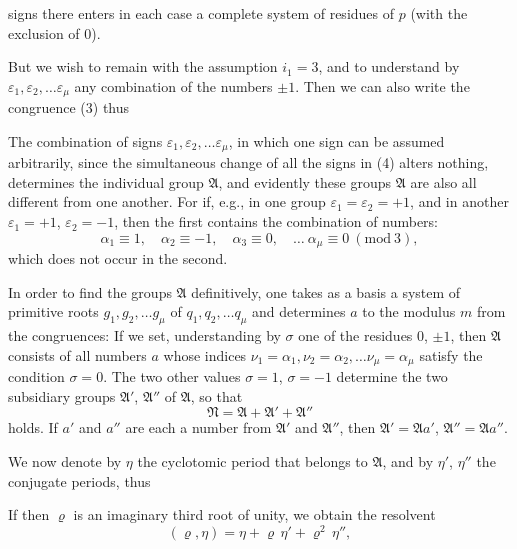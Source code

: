 signs there enters in each case a complete system of residues of $p$ (with the exclusion of 0).

But we wish to remain with the assumption $i_1=3$, and to understand by $\varepsilon_1, \varepsilon_2, \ldots \varepsilon_\mu$ any combination of the numbers $\pm 1$. Then we can also write the congruence (3) thus

The combination of signs $\varepsilon_1, \varepsilon_2, \ldots \varepsilon_\mu$, in which one sign can be assumed arbitrarily, since the simultaneous change of all the signs in (4) alters nothing, determines the individual group $\mathfrak{A}$, and evidently these groups $\mathfrak{A}$ are also all different from one another. For if, e.g., in one group $\varepsilon_1=\varepsilon_2=+1$, and in another $\varepsilon_1=+1$, $\varepsilon_2=-1$, then the first contains the combination of numbers:
\[
\alpha_1\equiv 1,\quad \alpha_2\equiv -1,\quad \alpha_3\equiv 0,\quad \ldots\ \alpha_\mu\equiv 0\ (\mathrm{mod}\ 3),
\]
which does not occur in the second.

In order to find the groups $\mathfrak{A}$ definitively, one takes as a basis a system of primitive roots $g_1, g_2, \ldots g_\mu$ of $q_1, q_2, \ldots q_\mu$ and determines $a$ to the modulus $m$ from the congruences:
If we set, understanding by $\sigma$ one of the residues 0, $\pm 1$,
then $\mathfrak{A}$ consists of all numbers $a$ whose indices $\nu_1=\alpha_1, \nu_2=\alpha_2, \ldots \nu_\mu=\alpha_\mu$ satisfy the condition $\sigma=0$. The two other values $\sigma=1$, $\sigma=-1$ determine the two subsidiary groups
$\mathfrak{A}'$, $\mathfrak{A}''$ of $\mathfrak{A}$, so that
\[
\mathfrak{N} = \mathfrak{A} + \mathfrak{A}' + \mathfrak{A}''
\]
holds. If $a'$ and $a''$ are each a number from $\mathfrak{A}'$ and $\mathfrak{A}''$, then $\mathfrak{A}'=\mathfrak{A}a'$, $\mathfrak{A}''=\mathfrak{A}a''$.

We now denote by $\eta$ the cyclotomic period that belongs to $\mathfrak{A}$, and by $\eta'$, $\eta''$ the conjugate periods, thus

If then $\varrho$ is an imaginary third root of unity, we obtain the resolvent
\[
(\varrho, \eta) = \eta + \varrho\,\eta' + \varrho^2\,\eta'',
\]

